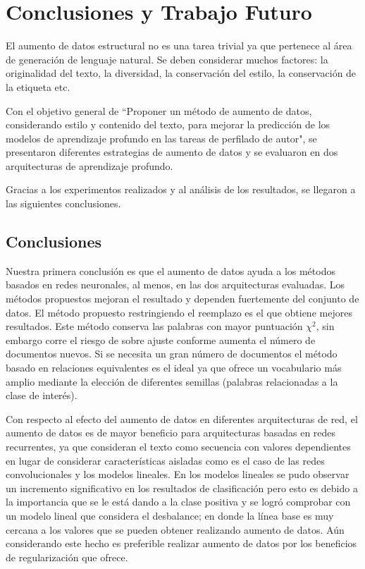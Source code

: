 
\chapter{Conclusiones y Trabajo Futuro}
El aumento de datos estructural no es una tarea trivial ya que pertenece al área de generación de lenguaje natural. Se deben considerar muchos factores: la originalidad del texto, la diversidad, la conservación del estilo, la conservación de la etiqueta etc. 

Con el objetivo general de ``Proponer  un  método  de  aumento  de  datos,  considerando  estilo  y  contenido  del texto, para mejorar la predicción de los modelos de aprendizaje profundo en las tareas de perfilado de autor", se presentaron diferentes estrategias de aumento de datos y se evaluaron en dos arquitecturas de aprendizaje profundo. 

Gracias a los experimentos realizados y al análisis de los resultados, se llegaron a las siguientes conclusiones.

\section{Conclusiones}

Nuestra primera conclusión es que el aumento de datos ayuda a los métodos basados en redes neuronales, al menos, en las dos arquitecturas evaluadas. Los métodos propuestos mejoran el resultado y dependen fuertemente del conjunto de datos.    
  El método propuesto restringiendo el reemplazo es el que  obtiene mejores resultados. Este método conserva las palabras con mayor puntuación $\chi^2$, sin embargo corre el riesgo de sobre ajuste conforme aumenta el número de documentos nuevos. Si se necesita un gran número de documentos el método basado en relaciones equivalentes es el ideal ya que ofrece un vocabulario más amplio mediante la elección de diferentes semillas (palabras relacionadas a la clase de interés). 

Con respecto al efecto del aumento de datos en diferentes arquitecturas de red, el aumento de datos es de mayor beneficio para arquitecturas basadas en redes recurrentes, ya que consideran el texto como secuencia con valores dependientes en lugar de considerar características aisladas como es el caso de las redes convolucionales y los modelos lineales. En los modelos lineales se pudo observar un incremento significativo en los resultados de clasificación pero esto es debido a la importancia que se le está dando a la clase positiva y se logró comprobar con un modelo lineal que considera el desbalance; en donde la línea base es muy cercana a los valores que se pueden obtener realizando aumento de datos. Aún considerando este hecho es preferible realizar aumento de datos por los beneficios de regularización que ofrece.

